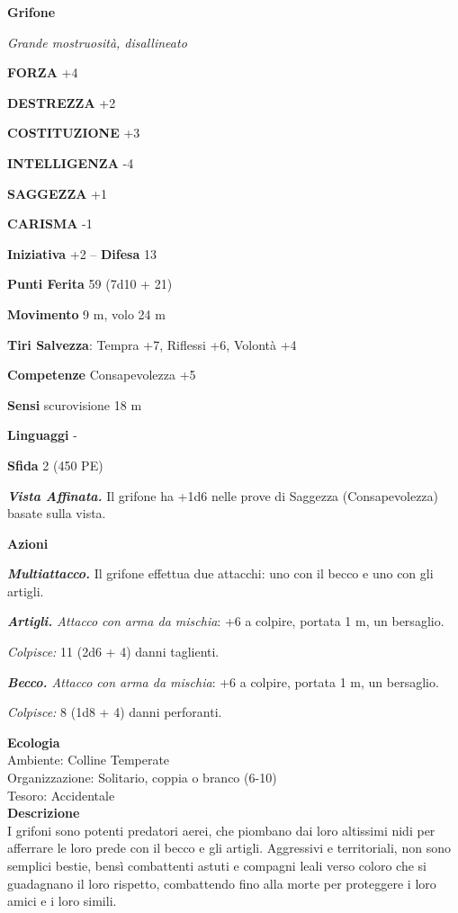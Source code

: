 \begin{multicols}{2}
\medskip{}\textbf{Grifone}

\emph{Grande mostruosità, disallineato}

\textbf{FORZA} +4

\textbf{DESTREZZA} +2

\textbf{COSTITUZIONE} +3

\textbf{INTELLIGENZA} -4

\textbf{SAGGEZZA} +1

\textbf{CARISMA} -1

\textbf{Iniziativa} +2 -- \textbf{Difesa} 13

\textbf{Punti Ferita} 59 (7d10 + 21)

\textbf{Movimento} 9 m, volo 24 m

\textbf{Tiri Salvezza}: Tempra +7, Riflessi +6, Volontà +4

\textbf{Competenze} Consapevolezza +5

\textbf{Sensi} scurovisione 18 m

\textbf{Linguaggi} -

\textbf{Sfida} 2 (450 PE)

\emph{\textbf{Vista Affinata.}} Il grifone ha +1d6 nelle prove di Saggezza (Consapevolezza) basate sulla vista.

\textbf{Azioni}

\emph{\textbf{Multiattacco.}} Il grifone effettua due attacchi: uno con il becco e uno con gli artigli.

\emph{\textbf{Artigli.} Attacco con arma da mischia}: +6 a colpire, portata 1 m, un bersaglio.

\emph{Colpisce:} 11 (2d6 + 4) danni taglienti.

\emph{\textbf{Becco.} Attacco con arma da mischia}: +6 a colpire, portata 1 m, un bersaglio.

\emph{Colpisce:} 8 (1d8 + 4) danni perforanti.

\textbf{Ecologia}\\
Ambiente: Colline Temperate\\
Organizzazione: Solitario, coppia o branco (6-10)\\
Tesoro: Accidentale\\
\textbf{Descrizione}\\
I grifoni sono potenti predatori aerei, che piombano dai loro altissimi nidi per afferrare le loro prede con il becco e gli artigli. Aggressivi e territoriali, non sono semplici bestie, bensì combattenti astuti e compagni leali verso coloro che si guadagnano il loro rispetto, combattendo fino alla morte per proteggere i loro amici e i loro simili.\\


\end{multicols}

